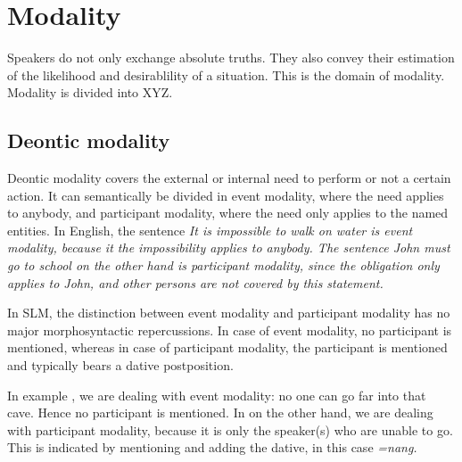 \section{Modality}\label{sec:func:Modality}
Speakers do not only exchange absolute truths. They also convey their estimation of the likelihood and desirablility of a situation. This is the domain of modality. Modality is divided into XYZ\kuckn.

\subsection{Deontic modality}\label{sec:func:Deonticmodality}
Deontic modality covers the external or internal need to perform or not a certain action. It can semantically be divided in event modality, where the need applies to anybody, and participant modality, where the need only applies to the named entities. In English, the sentence \em It is impossible to walk on water \em is event modality, because it the impossibility applies to anybody. The sentence \em John must go to school \em on the other hand is participant modality, since the obligation only applies to John, and other persons are not covered by this statement.

In SLM, the distinction between event modality and participant modality has no major morphosyntactic repercussions. In case of event modality, no participant is mentioned, whereas in case of participant modality, the participant is mentioned and typically bears a dative postposition.

In example , we are dealing with event modality: no one can go far into that cave. Hence no participant is mentioned. In  on the other hand, we are dealing with participant modality, because it is only the speaker(s) who are unable to go. This is indicated by mentioning  and adding the dative, in this case \em =nang\em.


\\

